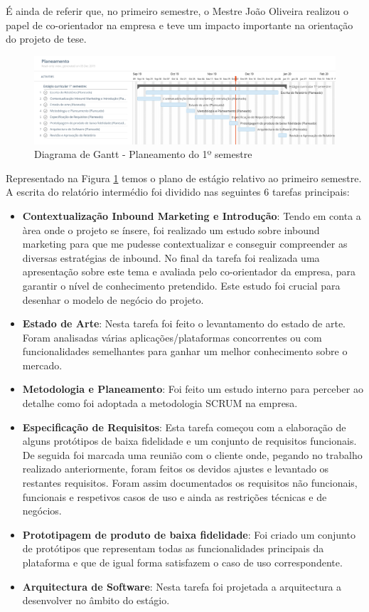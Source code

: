 É ainda de referir que, no primeiro semestre, o Mestre João Oliveira realizou o papel de co-orientador na empresa e teve um impacto importante na orientação do projeto de tese. 

\begin{figure}[ht!]
	\begin{center}
		\includegraphics[width=1\textwidth]{img/gantt/semestre1.jpeg}
		\caption{Diagrama de Gantt - Planeamento do 1º semestre}
		\label{fig:gantt1}
	\end{center}
\end{figure}

Representado na Figura \ref{fig:gantt1} temos o plano de estágio relativo ao primeiro semestre. A escrita do relatório intermédio foi dividido nas seguintes 6 tarefas principais:
\begin{itemize}
	\item \textbf{Contextualização Inbound Marketing e Introdução}: Tendo em conta a àrea onde o projeto se ínsere, foi realizado um estudo sobre inbound marketing para que me pudesse contextualizar e conseguir compreender as diversas estratégias de inbound. No final da tarefa foi realizada uma apresentação sobre este tema e avaliada pelo co-orientador da empresa, para garantir o nível de conhecimento pretendido. Este estudo foi crucial para desenhar o modelo de negócio do projeto.
	\item \textbf{Estado de Arte}: Nesta tarefa foi feito o levantamento do estado de arte. Foram analisadas várias aplicações/plataformas concorrentes ou com funcionalidades semelhantes para ganhar um melhor conhecimento sobre o mercado.
	\item \textbf{Metodologia e Planeamento}: Foi feito um estudo interno para perceber ao detalhe como foi adoptada a metodologia SCRUM na empresa.
	\item \textbf{Especificação de Requisitos}: Esta tarefa começou com a elaboração de alguns protótipos de baixa fidelidade e um conjunto de requisitos funcionais. De seguida foi marcada uma reunião com o cliente onde, pegando no trabalho realizado anteriormente, foram feitos os devidos ajustes e levantado os restantes requisitos. Foram assim documentados os requisitos não funcionais, funcionais e respetivos casos de uso e ainda as restrições técnicas e de negócios.
	\item \textbf{Prototipagem de produto de baixa fidelidade}: Foi criado um conjunto de protótipos que representam todas as funcionalidades principais da plataforma e que de igual forma satisfazem o caso de uso correspondente.
	\item \textbf{Arquitectura de Software}: Nesta tarefa foi projetada a arquitectura a desenvolver no âmbito do estágio.
\end{itemize}

